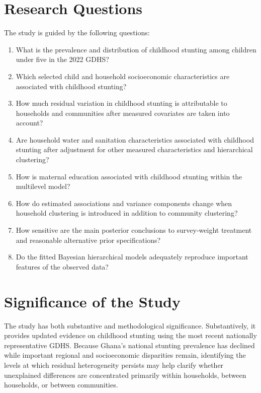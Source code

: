 \section{Research Questions}

The study is guided by the following questions:

\begin{enumerate}
    \item What is the prevalence and distribution of childhood stunting among children under five in the 2022 GDHS?
    \item Which selected child and household socioeconomic characteristics are associated with childhood stunting?
    \item How much residual variation in childhood stunting is attributable to households and communities after measured covariates are taken into account?
    \item Are household water and sanitation characteristics associated with childhood stunting after adjustment for other measured characteristics and hierarchical clustering?
    \item How is maternal education associated with childhood stunting within the multilevel model?
    \item How do estimated associations and variance components change when household clustering is introduced in addition to community clustering?
    \item How sensitive are the main posterior conclusions to survey-weight treatment and reasonable alternative prior specifications?
    \item Do the fitted Bayesian hierarchical models adequately reproduce important features of the observed data?
\end{enumerate}

\section{Significance of the Study}

The study has both substantive and methodological significance. Substantively, it provides updated evidence on childhood stunting using the most recent nationally representative GDHS. Because Ghana's national stunting prevalence has declined while important regional and socioeconomic disparities remain, identifying the levels at which residual heterogeneity persists may help clarify whether unexplained differences are concentrated primarily within households, between households, or between communities.

